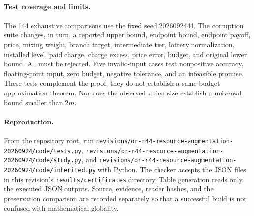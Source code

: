 \paragraph{Test coverage and limits.}
The 144 exhaustive comparisons use the fixed seed 2026092444. The corruption suite changes, in turn, a reported upper bound, endpoint bound, endpoint payoff, price, mixing weight, branch target, intermediate tier, lottery normalization, installed level, paid charge, charge excess, price error, budget, and original lower bound. All must be rejected. Five invalid-input cases test nonpositive accuracy, floating-point input, zero budget, negative tolerance, and an infeasible promise. These tests complement the proof; they do not establish a same-budget approximation theorem. Nor does the observed union size establish a universal bound smaller than $2m$.

\paragraph{Reproduction.}
From the repository root, run \nolinkurl{revisions/or-r44-resource-augmentation-20260924/code/tests.py}, \nolinkurl{revisions/or-r44-resource-augmentation-20260924/code/study.py}, and \nolinkurl{revisions/or-r44-resource-augmentation-20260924/code/inherited.py} with Python. The checker accepts the JSON files in this revision's \texttt{results/certificates} directory. Table generation reads only the executed JSON outputs. Source, evidence, reader hashes, and the preservation comparison are recorded separately so that a successful build is not confused with mathematical globality.
